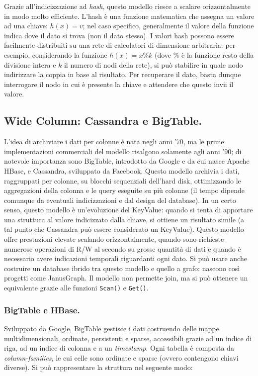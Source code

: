 \documentclass[a4page, 11pt]{article}
\begin{document}
Grazie all'indicizzazione ad \textit{hash}, questo modello riesce a scalare orizzontalmente in modo molto efficiente.
L'hash è una funzione matematica che assegna un valore ad una chiave: $h(x) = v$; nel caso specifico, generalmente il valore della funzione indica dove il dato si trova (non il dato stesso).
I valori hash possono essere facilmente distribuiti su una rete di calcolatori di dimensione arbitraria: per esempio, considerando la funzione $h(x) = x \% k$ (dove $\%$ è la funzione resto della divisione intera e $k$ il numero di nodi della rete), si può stabilire in quale nodo indirizzare la coppia in base al risultato.
Per recuperare il dato, basta dunque interrogare il nodo in cui è presente la chiave e attendere che questo invii il valore.


\subsection{Wide Column: Cassandra\cite{Cassandra} e BigTable.}
L'idea di archiviare i dati per colonne è nata negli anni '70, ma le prime implementazioni commerciali del modello risalgono solamente agli anni '90; di notevole importanza sono BigTable, introdotto da Google e da cui nasce Apache HBase, e Cassandra, sviluppato da Facebook.
Questo modello archivia i dati, raggruppati per colonne, su blocchi sequenziali dell'hard disk, ottimizzando le aggregazioni della colonna e le query eseguite su più colonne (il tempo dipende comunque da eventuali indicizzazioni e dal design del database).
In un certo senso, questo modello è un'evoluzione del KeyValue: quando si tenta di apportare una struttura al valore indicizzato dalla chiave, si ottiene un risultato simile (a tal punto che Cassandra può essere considerato un KeyValue).
Questo modello offre prestazioni elevate scalando orizzontalmente, quando sono richieste numerose operazioni di R/W al secondo su grosse quantità di dati e quando è necessario avere indicazioni temporali riguardanti ogni dato.
Si può usare anche costruire un database ibrido tra questo modello e quello a grafo: nascono così progetti come JanusGraph.
Il modello non permette join, ma si può ottenere un equivalente grazie alle funzioni \verb|Scan()| e \verb|Get()|.

\subsubsection*{BigTable e HBase.}
Sviluppato da Google, BigTable gestisce i dati costruendo delle mappe multidimensionali, ordinate, persistenti e sparse, accessibili grazie ad un indice di riga, ad un indice di colonna e a un \textit{timestamp}.
Ogni tabella è composta da \textit{column-families}, le cui celle sono ordinate e sparse (ovvero contengono chiavi diverse).
Si può rappresentare la struttura nel seguente modo:
\end{document}
